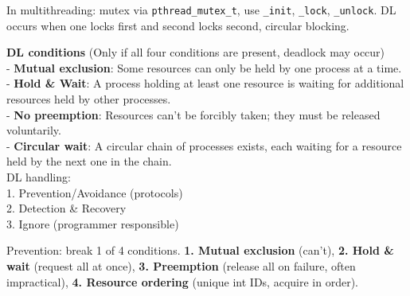 In multithreading: mutex via \texttt{pthread\_mutex\_t}, use \texttt{\_init}, \texttt{\_lock}, \texttt{\_unlock}. DL occurs when one locks first and second locks second, circular blocking.

\textbf{DL conditions}
(Only if all four conditions are present, deadlock may occur)\\
- \textbf{Mutual exclusion}: Some resources can only be held by one process at a time.\\
- \textbf{Hold \& Wait}: A process holding at least one resource is waiting for additional resources held by other processes.\\
- \textbf{No preemption}: Resources can't be forcibly taken; they must be released voluntarily.\\
- \textbf{Circular wait}: A circular chain of processes exists, each waiting for a resource held by the next one in the chain.\\

DL handling:\\
1. Prevention/Avoidance (protocols)\\
2. Detection \& Recovery\\
3. Ignore (programmer responsible) 

Prevention: break 1 of 4 conditions. \textbf{1. Mutual exclusion} (can't), \textbf{2. Hold \& wait} (request all at once), \textbf{3. Preemption} (release all on failure, often impractical), \textbf{4. Resource ordering} (unique int IDs, acquire in order).
